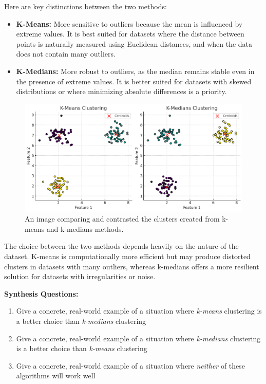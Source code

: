     Here are key distinctions between the two methods:
    
    \begin{itemize}
        \item \textbf{K-Means:} More sensitive to outliers because the mean is influenced by extreme values. It is best suited for datasets where the distance between points is naturally measured using Euclidean distances, and when the data does not contain many outliers.
        
        \item \textbf{K-Medians:} More robust to outliers, as the median remains stable even in the presence of extreme values. It is better suited for datasets with skewed distributions or where minimizing absolute differences is a priority.
    \end{itemize}

    \begin{figure}[H]
        \centering
        \includegraphics[width=0.45\linewidth]{ml/K-clustering.png}
        \caption{ An image comparing and contrasted the clusters created from k-means and k-medians methods.}
        \label{fig:K-clustering}
    \end{figure}
    
    The choice between the two methods depends heavily on the nature of the dataset. K-means is computationally more efficient but may produce distorted clusters in datasets with many outliers, whereas k-medians offers a more resilient solution for datasets with irregularities or noise.

\begin{questionbox}
\textbf{Synthesis Questions:}
\begin{enumerate}
    \item Give a concrete, real-world example of a situation where \textit{k-means} clustering is a better choice than \textit{k-medians} clustering
    \item Give a concrete, real-world example of a situation where \textit{k-medians} clustering is a better choice than \textit{k-means} clustering
    \item Give a concrete, real-world example of a situation where \textit{neither} of these algorithms will work well
\end{enumerate}
\end{questionbox}

